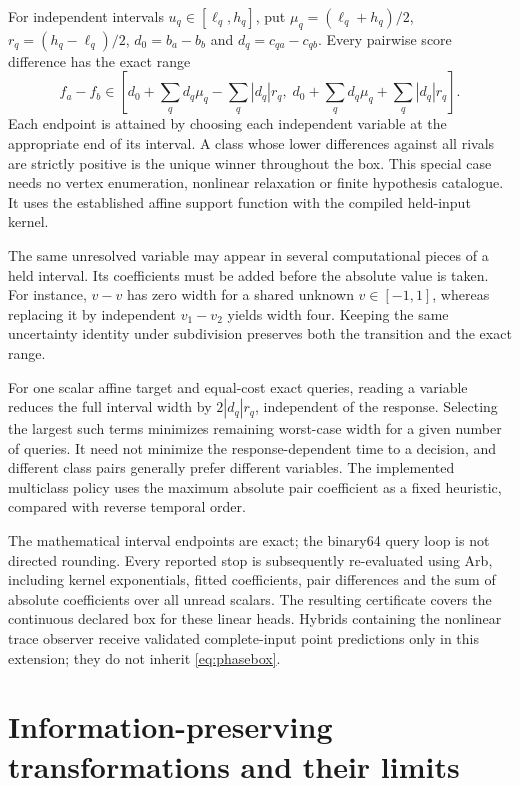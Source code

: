 \documentclass[11pt,a4paper]{article}
\theoremstyle{definition}\newtheorem{definition}[theorem]{Definition}
\begin{document}
For independent intervals $u_q\in[\ell_q,h_q]$, put $\mu_q=(\ell_q+h_q)/2$, $r_q=(h_q-\ell_q)/2$, $d_0=b_a-b_b$ and $d_q=c_{qa}-c_{qb}$. Every pairwise score difference has the exact range
\begin{equation}
 f_a-f_b\in\left[
 d_0+\sum_q d_q\mu_q-\sum_q|d_q|r_q,\;
 d_0+\sum_q d_q\mu_q+\sum_q|d_q|r_q
 \right].\label{eq:phasebox}
\end{equation}
Each endpoint is attained by choosing each independent variable at the appropriate end of its interval. A class whose lower differences against all rivals are strictly positive is the unique winner throughout the box. This special case needs no vertex enumeration, nonlinear relaxation or finite hypothesis catalogue. It uses the established affine support function with the compiled held-input kernel.

The same unresolved variable may appear in several computational pieces of a held interval. Its coefficients must be added before the absolute value is taken. For instance, $v-v$ has zero width for a shared unknown $v\in[-1,1]$, whereas replacing it by independent $v_1-v_2$ yields width four. Keeping the same uncertainty identity under subdivision preserves both the transition and the exact range.

For one scalar affine target and equal-cost exact queries, reading a variable reduces the full interval width by $2|d_q|r_q$, independent of the response. Selecting the largest such terms minimizes remaining worst-case width for a given number of queries. It need not minimize the response-dependent time to a decision, and different class pairs generally prefer different variables. The implemented multiclass policy uses the maximum absolute pair coefficient as a fixed heuristic, compared with reverse temporal order.

The mathematical interval endpoints are exact; the binary64 query loop is not directed rounding. Every reported stop is subsequently re-evaluated using Arb, including kernel exponentials, fitted coefficients, pair differences and the sum of absolute coefficients over all unread scalars. The resulting certificate covers the continuous declared box for these linear heads. Hybrids containing the nonlinear trace observer receive validated complete-input point predictions only in this extension; they do not inherit \eqref{eq:phasebox}.

\section{Information-preserving transformations and their limits}\label{sec:invariants}
\end{document}
